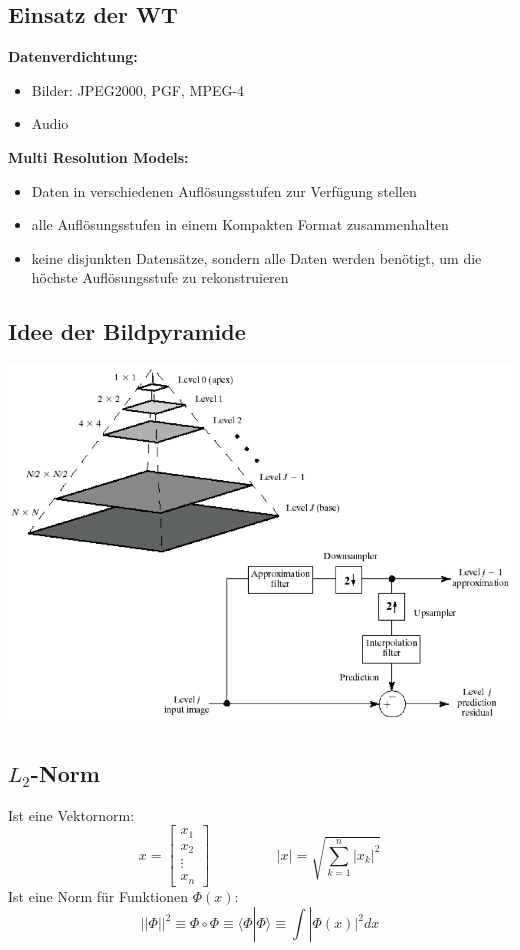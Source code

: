\documentclass[10pt]{article}
\begin{document}
\subsection{Einsatz der WT}
\textbf{Datenverdichtung:}
\begin{itemize}
	\item Bilder: JPEG2000, PGF, MPEG-4
	\item Audio
\end{itemize}
\textbf{Multi Resolution Models:}
\begin{itemize}
	\item Daten in verschiedenen Auflösungsstufen zur Verfügung stellen
	\item alle Auflösungsstufen in einem Kompakten Format zusammenhalten
	\item keine disjunkten Datensätze, sondern alle Daten werden benötigt, um die höchste Auflösungsstufe zu rekonstruieren
\end{itemize}

\subsection{Idee der Bildpyramide}
\begin{center}
	\includegraphics[scale=0.4]{wt-bildpyramide.png}
\end{center}

\subsection{$L_2$-Norm}
Ist eine Vektornorm:
\begin{equation*}
	x = \begin{bmatrix} x_1 \\ x_2 \\ \vdots \\ x_n \end{bmatrix} 
	\hspace{2cm}
	|x| = \sqrt{\sum_{k=1}^n |x_k|^2}
\end{equation*}
Ist eine Norm für Funktionen $\Phi(x)$:
\begin{equation*}
	||\Phi||^2 \equiv \Phi \circ \Phi \equiv \langle \Phi | \Phi \rangle \equiv \int |\Phi(x)|^2 dx
\end{equation*}
\end{document}
